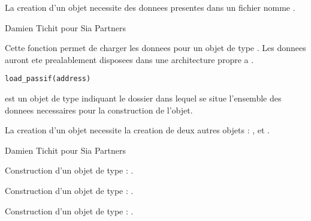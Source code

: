 \documentclass[a4paper]{book}
\begin{document}
%
\begin{Details}\relax
La creation d'un objet  necessite des donnees presentes dans un fichier nomme .
\end{Details}
%
\begin{Author}\relax
Damien Tichit pour Sia Partners
\end{Author}
%
\begin{Description}\relax
Cette fonction permet de charger les donnees pour un objet de type . Les donnees auront ete prealablement disposees dans
une architecture propre a .
\end{Description}
%
\begin{Usage}
\begin{verbatim}
load_passif(address)
\end{verbatim}
\end{Usage}
%
\begin{Arguments}
\begin{ldescription}
\item[\code{address}] est un objet de type  indiquant le dossier dans lequel se situe l'ensemble des donnees necessaires
pour la construction de l'objet.
\end{ldescription}
\end{Arguments}
%
\begin{Details}\relax
La creation d'un objet  necessite la creation de deux autres objets : ,  et .
\end{Details}
%
\begin{Author}\relax
Damien Tichit pour Sia Partners
\end{Author}
%
\begin{SeeAlso}\relax
Construction d'un objet de type  : .

Construction d'un objet de type  : .

Construction d'un objet de type  : .
\end{SeeAlso}
\end{document}
